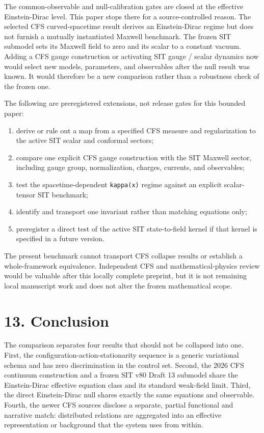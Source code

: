 \documentclass[
  american,
  11pt,
  letterpaper,
]{article}
\providecommand{\tightlist}{%
  \setlength{\itemsep}{0pt}\setlength{\parskip}{0pt}}
\begin{document}
The common-observable and null-calibration gates are closed at the effective Einstein-Dirac level. This paper stops there for a source-controlled reason. The selected CFS curved-spacetime result derives an Einstein-Dirac regime but does not furnish a mutually instantiated Maxwell benchmark. The frozen SIT submodel sets its Maxwell field to zero and its scalar to a constant vacuum. Adding a CFS gauge construction or activating SIT gauge / scalar dynamics now would select new models, parameters, and observables after the null result was known. It would therefore be a new comparison rather than a robustness check of the frozen one.

The following are preregistered extensions, not release gates for this bounded paper:

\begin{enumerate}
\def\labelenumi{\arabic{enumi}.}
\tightlist
\item
  derive or rule out a map from a specified CFS measure and regularization to the active SIT scalar and conformal sectors;
\item
  compare one explicit CFS gauge construction with the SIT Maxwell sector, including gauge group, normalization, charges, currents, and observables;
\item
  test the spacetime-dependent \texttt{kappa(x)} regime against an explicit scalar-tensor SIT benchmark;
\item
  identify and transport one invariant rather than matching equations only;
\item
  preregister a direct test of the active SIT state-to-field kernel if that kernel is specified in a future version.
\end{enumerate}

The present benchmark cannot transport CFS collapse results or establish a whole-framework equivalence. Independent CFS and mathematical-physics review would be valuable after this locally complete preprint, but it is not remaining local manuscript work and does not alter the frozen mathematical scope.

\section{13. Conclusion}\label{conclusion}

The comparison separates four results that should not be collapsed into one. First, the configuration-action-stationarity sequence is a generic variational schema and has zero discrimination in the control set. Second, the 2026 CFS continuum construction and a frozen SIT v80 Draft 13 submodel share the Einstein-Dirac effective equation class and its standard weak-field limit. Third, the direct Einstein-Dirac null shares exactly the same equations and observable. Fourth, the newer CFS sources disclose a separate, partial functional and narrative match: distributed relations are aggregated into an effective representation or background that the system uses from within.
\end{document}
